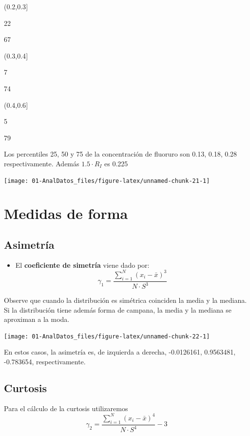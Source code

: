 \documentclass[]{book}
\providecommand{\tightlist}{%
  \setlength{\itemsep}{0pt}\setlength{\parskip}{0pt}}
\theoremstyle{definition}
\theoremstyle{definition}
\theoremstyle{definition}
\theoremstyle{remark}
\begin{document}
(0.2,0.3{]}

22

67

(0.3,0.4{]}

7

74

(0.4,0.6{]}

5

79

Los percentiles 25, 50 y 75 de la concentración de fluoruro son 0.13,
0.18, 0.28 respectivamente. Además \(1.5 \cdot R_I\) es 0.225

\begin{center}\texttt{[image: 01-AnalDatos\_files/figure-latex/unnamed-chunk-21-1]} \end{center}

\section{Medidas de forma}\label{medidas-de-forma}

\subsection{Asimetría}\label{asimetria}

\begin{itemize}
\tightlist
\item
  El \textbf{coeficiente de simetría} viene dado por:
  \[\gamma_1 = \frac{\sum_{i=1}^N (x_i - \bar{x})^3}{N \cdot S^3}\]
\end{itemize}

Observe que cuando la distribución es simétrica coinciden la media y la
mediana. Si la distribución tiene además forma de campana, la media y la
mediana se aproximan a la moda.

\begin{center}\texttt{[image: 01-AnalDatos\_files/figure-latex/unnamed-chunk-22-1]} \end{center}

En estos casos, la asimetría es, de izquierda a derecha, -0.0126161,
0.9563481, -0.783654, respectivamente.

\subsection{Curtosis}\label{curtosis}

Para el cálculo de la curtosis utilizaremos
\[\gamma_2  =  \frac{\sum_{i=1}^N (x_i - \bar{x})^4}{N \cdot S^4}-3\]
\end{document}
